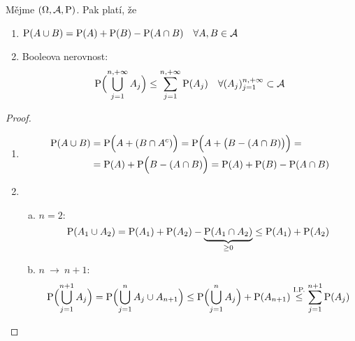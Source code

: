 \begin{theorem}
	Mějme $(\Omega,\mathcal{A},\mathrm{P})$. Pak platí, že
	\begin{enumerate}
		\item $\mathrm{P}(A \cup B) = \mathrm{P}(A)+\mathrm{P}(B)-\mathrm{P}(A \cap B)~~~\forall A,B \in \mathcal{A} $
		\item Booleova nerovnost:
		\[
		 \mathrm{P}\Bigl(\bigcup\limits_{j=1}^{n,+\infty} A_j\Bigr) \leq \sum\limits_{j=1}^{n,+\infty} \mathrm{P}(A_j)~~~\forall (A_j)_{j=1}^{n,+\infty} \subset \mathcal{A}
		\]
	\end{enumerate}
\begin{proof}
	\begin{enumerate}
	\item \[
	\begin{split}
	\mathrm{P}(A \cup B)&=\mathrm{P}\Bigl(A+(B \cap A^c)\Bigr) = \mathrm{P}\Bigl(A+\bigl(B-(A \cap B)\bigr)\Bigr) = \\ &= \mathrm{P}(A)+\mathrm{P}\Bigl(B-(A \cap B)\Bigr)=\mathrm{P}(A)+\mathrm{P}(B)-\mathrm{P}(A \cap B)
	\end{split}
	\]
	\item \begin{enumerate}[a)]\item $n=2$: $$\mathrm{P}(A_1 \cup A_2)=\mathrm{P}(A_1)+\mathrm{P}(A_2)-\underbrace{\mathrm{P}(A_1 \cap A_2)}_{\geq 0} \leq \mathrm{P}(A_1)+\mathrm{P}(A_2)$$
	\item $n ~\to~ n+1$: $$\mathrm{P}\Bigl( \bigcup_{j=1}^{n+1} A_j \Bigr) =\mathrm{P}\Bigl(\bigcup_{j=1}^{n} A_j \cup A_{n+1}\Bigr) \leq \mathrm{P}\Bigl(\bigcup_{j=1}^{n} A_j\Bigr)+\mathrm{P}(A_{n+1}) \stackrel{\text{I.P.}}{\leq} \sum\limits_{j=1}^{n+1}\mathrm{P}(A_j)$$
\end{enumerate}\end{enumerate}
\end{proof}
\end{theorem}

